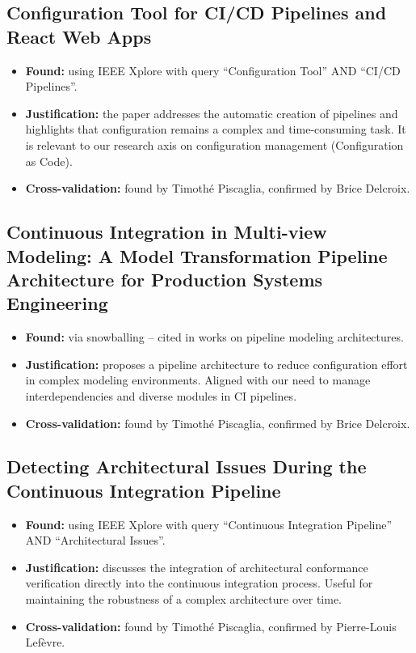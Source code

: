 \documentclass[a4paper,11pt,oneside]{article}
\begin{document}
\subsection{Configuration Tool for CI/CD Pipelines and React Web Apps \cite{Bozhkov2024}}
%
\begin{itemize}
    \item \textbf{Found:} using IEEE Xplore with query ``Configuration Tool'' AND ``CI/CD Pipelines''.
    \item \textbf{Justification:} the paper addresses the automatic creation of pipelines and highlights that configuration remains a complex and time-consuming task. It is relevant to our research axis on configuration management (Configuration as Code).
    \item \textbf{Cross-validation:} found by Timoth\'{e} Piscaglia, confirmed by Brice Delcroix.
\end{itemize}

\subsection{Continuous Integration in Multi-view Modeling: A Model Transformation Pipeline Architecture for Production Systems Engineering \cite{Wimmer2021}}
%
\begin{itemize}
    \item \textbf{Found:} via snowballing -- cited in works on pipeline modeling architectures.
    \item \textbf{Justification:} proposes a pipeline architecture to reduce configuration effort in complex modeling environments. Aligned with our need to manage interdependencies and diverse modules in CI pipelines.
    \item \textbf{Cross-validation:} found by Timoth\'{e} Piscaglia, confirmed by Brice Delcroix.
\end{itemize}

\subsection{Detecting Architectural Issues During the Continuous Integration Pipeline \cite{ZampettiMODELS2019}}
%
\begin{itemize}
    \item \textbf{Found:} using IEEE Xplore with query ``Continuous Integration Pipeline'' AND ``Architectural Issues''.
    \item \textbf{Justification:} discusses the integration of architectural conformance verification directly into the continuous integration process. Useful for maintaining the robustness of a complex architecture over time.
    \item \textbf{Cross-validation:} found by Timoth\'{e} Piscaglia, confirmed by Pierre-Louis Lef\`{e}vre.
\end{itemize}
\end{document}
